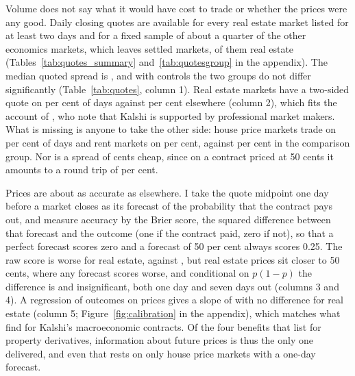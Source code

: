 \documentclass[12pt,a4paper]{article}
\begin{document}
Volume does not say what it would have cost to trade or whether the prices were any good. Daily closing quotes are available for every real estate market listed for at least two days and for a fixed sample of about a quarter of the other economics markets, which leaves \quoteMarkets{} settled markets, \quoteReMarkets{} of them real estate (Tables~\ref{tab:quotes_summary} and~\ref{tab:quotesgroup} in the appendix). The median quoted spread is \spreadComparison{}, and with controls the two groups do not differ significantly (Table~\ref{tab:quotes}, column 1). Real estate markets have a two-sided quote on \twoSidedRe{} per cent of days against \twoSidedOther{} per cent elsewhere (column 2), which fits the account of \citet{diercks2026kalshi}, who note that Kalshi is supported by professional market makers. What is missing is anyone to take the other side: house price markets trade on \priceDaysTraded{} per cent of days and rent markets on \rentDaysTraded{} per cent, against \otherDaysTraded{} per cent in the comparison group. Nor is a spread of \spreadRe{} cents cheap, since on a contract priced at 50 cents it amounts to a round trip of \spreadRoundTrip{} per cent.

Prices are about as accurate as elsewhere. I take the quote midpoint one day before a market closes as its forecast of the probability that the contract pays out, and measure accuracy by the Brier score, the squared difference between that forecast and the outcome (one if the contract paid, zero if not), so that a perfect forecast scores zero and a forecast of 50 per cent always scores 0.25. The raw score is worse for real estate, \brierRe{} against \brierOther{}, but real estate prices sit closer to 50 cents, where any forecast scores worse, and conditional on $p(1-p)$ the difference is \brierDiff{} and insignificant, both one day and seven days out (columns 3 and 4). A regression of outcomes on prices gives a slope of \calSlope{} with no difference for real estate (column 5; Figure~\ref{fig:calibration} in the appendix), which matches what \citet{diercks2026kalshi} find for Kalshi's macroeconomic contracts. Of the four benefits that \citet{fabozzi2020thirty} list for property derivatives, information about future prices is thus the only one delivered, and even that rests on only \priceForecastN{} house price markets with a one-day forecast.
\end{document}
